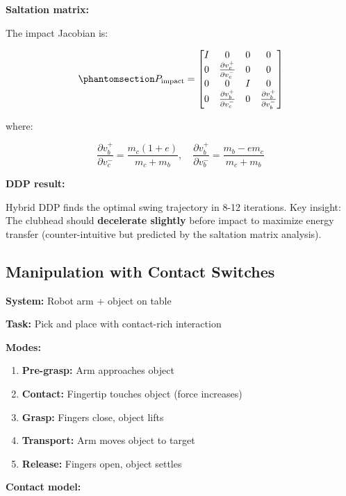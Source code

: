 \documentclass[
  letterpaper,
  DIV=11,
  numbers=noendperiod]{scrartcl}
\providecommand{\tightlist}{%
  \setlength{\itemsep}{0pt}\setlength{\parskip}{0pt}}\usepackage{longtable,booktabs,array}
\begin{document}
\textbf{Saltation matrix:}

The impact Jacobian is:

\begin{equation}\phantomsection\label{eq-golf-saltation}{
P_{\text{impact}} = \begin{bmatrix}
I & 0 & 0 & 0 \\
0 & \frac{\partial v_c^+}{\partial v_c^-} & 0 & 0 \\
0 & 0 & I & 0 \\
0 & \frac{\partial v_b^+}{\partial v_c^-} & 0 & \frac{\partial v_b^+}{\partial v_b^-}
\end{bmatrix}
}\end{equation}

where:

\[
\frac{\partial v_b^+}{\partial v_c^-} = \frac{m_c(1+e)}{m_c + m_b}, \quad \frac{\partial v_b^+}{\partial v_b^-} = \frac{m_b - e m_c}{m_c + m_b}
\]

\textbf{DDP result:}

Hybrid DDP finds the optimal swing trajectory in 8-12 iterations. Key
insight: The clubhead should \textbf{decelerate slightly} before impact
to maximize energy transfer (counter-intuitive but predicted by the
saltation matrix analysis).

\subsection{Manipulation with Contact
Switches}\label{manipulation-with-contact-switches}

\textbf{System:} Robot arm + object on table

\textbf{Task:} Pick and place with contact-rich interaction

\textbf{Modes:}

\begin{enumerate}
\def\labelenumi{\arabic{enumi}.}
\tightlist
\item
  \textbf{Pre-grasp:} Arm approaches object
\item
  \textbf{Contact:} Fingertip touches object (force increases)
\item
  \textbf{Grasp:} Fingers close, object lifts
\item
  \textbf{Transport:} Arm moves object to target
\item
  \textbf{Release:} Fingers open, object settles
\end{enumerate}

\textbf{Contact model:}
\end{document}
